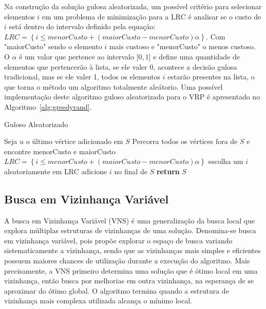\documentclass[12pt, a4paper]{article}
\begin{document}
Na construção da solução gulosa aleatorizada, um possível critério para selecionar elementos $i$ em um problema de minimização para a LRC é analisar se o custo de $i$ está dentro do intervalo definido pela equação: $LRC = \left\{i \leq menorCusto + (maiorCusto - menorCusto)\alpha \right\}$. Com "maiorCusto" sendo o elemento $i$ mais custoso e "menorCusto" o menos custoso. O $\alpha$ é um valor que pertence ao intervalo [$0, 1$] e define uma quantidade de elementos que pertencerão à lista, se ele valer 0, acontece a decisão gulosa  tradicional, mas se ele valer 1, todos os elementos $i$ estarão presentes na lista, o que torna o método um algoritmo totalmente aleátorio. Uma possível implementação deste algoritmo guloso aleatorizado para o VRP é apresentado no Algoritmo~\ref{alg:greedyrand}.
%
\begin{algorithm}[htb!]
  \caption{Guloso Aleatorizado}\label{alg:greedyrand}
  \begin{algorithmic}[1]
    		\State Seja $u$  o último vértice adicionado em $S$
    		\State Percorra todos os vértices fora de $S$ e encontre menorCusto e maiorCusto
		\State $LRC = \left\{i \leq menorCusto + (maiorCusto - menorCusto)\alpha \right\}$
		\State escolha um $i$ aleatoriamente em LRC
		\State adicione $i$ no final de $S$
      	\EndWhile
      \State \textbf{return} $S$
      \EndFunction
  \end{algorithmic}
\end{algorithm}


\subsection{Busca em Vizinhança Variável}

A busca em Vizinhança Variável (VNS) é uma generalização da busca local que explora múltiplas estruturas de vizinhanças de uma solução. Denomina-se busca em vizinhança variável, pois propõe explorar o espaço de busca variando sistematicamente a vizinhança, sendo que as vizinhanças mais simples e eficientes possuem maiores chances de utilização durante a execução do algoritmo. Mais precisamente, a VNS primeiro determina uma solução que é ótimo local em uma vizinhança, então busca por melhorias em outra vizinhança, na esperança de se aproximar do ótimo global. O algoritmo termina quando a estrutura de vizinhança mais complexa utilizada alcança o mínimo local.
\end{document}
